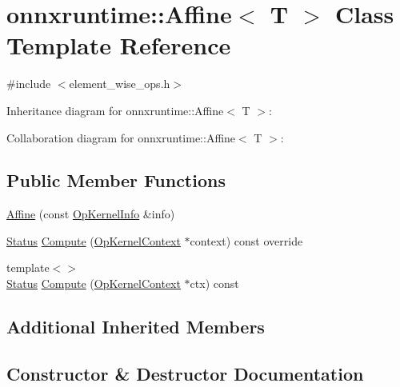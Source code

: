 \hypertarget{classonnxruntime_1_1Affine}{}\section{onnxruntime\+:\+:Affine$<$ T $>$ Class Template Reference}
\label{classonnxruntime_1_1Affine}


{\ttfamily \#include $<$element\+\_\+wise\+\_\+ops.\+h$>$}



Inheritance diagram for onnxruntime\+:\+:Affine$<$ T $>$\+:


Collaboration diagram for onnxruntime\+:\+:Affine$<$ T $>$\+:
\subsection*{Public Member Functions}
\begin{DoxyCompactItemize}
\item 
\mbox{\hyperlink{classonnxruntime_1_1Affine_a97e1dc16a9c4fd97e60b8120992df0b6}{Affine}} (const \mbox{\hyperlink{classonnxruntime_1_1OpKernelInfo}{Op\+Kernel\+Info}} \&info)
\item 
\mbox{\hyperlink{classonnxruntime_1_1common_1_1Status}{Status}} \mbox{\hyperlink{classonnxruntime_1_1Affine_a0fef6fd3c2fb85468d959080b43dc683}{Compute}} (\mbox{\hyperlink{classonnxruntime_1_1OpKernelContext}{Op\+Kernel\+Context}} $\ast$context) const override
\item 
{\footnotesize template$<$$>$ }\\\mbox{\hyperlink{classonnxruntime_1_1common_1_1Status}{Status}} \mbox{\hyperlink{classonnxruntime_1_1Affine_ad9bbf2b9b16c87c75c2fd81c818af1ff}{Compute}} (\mbox{\hyperlink{classonnxruntime_1_1OpKernelContext}{Op\+Kernel\+Context}} $\ast$ctx) const
\end{DoxyCompactItemize}
\subsection*{Additional Inherited Members}


\subsection{Constructor \& Destructor Documentation}
\mbox{\label{classonnxruntime_1_1Affine_a97e1dc16a9c4fd97e60b8120992df0b6}} 
